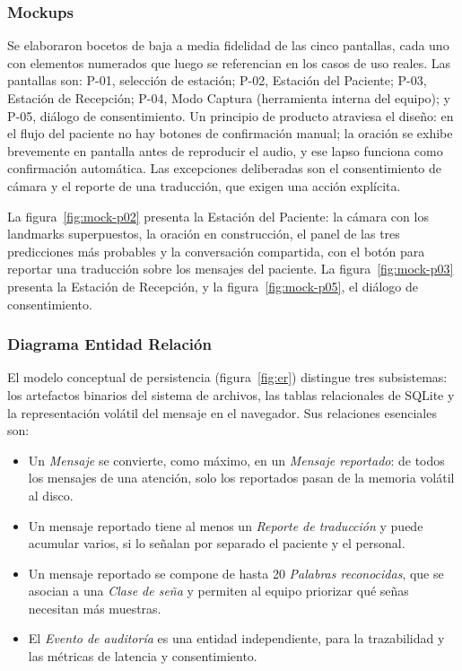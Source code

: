 \subsubsection{Mockups}

Se elaboraron bocetos de baja a media fidelidad de las cinco pantallas, cada uno con elementos numerados que luego se referencian en los casos de uso reales. Las pantallas son: P-01, selección de estación; P-02, Estación del Paciente; P-03, Estación de Recepción; P-04, Modo Captura (herramienta interna del equipo); y P-05, diálogo de consentimiento. Un principio de producto atraviesa el diseño: en el flujo del paciente no hay botones de confirmación manual; la oración se exhibe brevemente en pantalla antes de reproducir el audio, y ese lapso funciona como confirmación automática. Las excepciones deliberadas son el consentimiento de cámara y el reporte de una traducción, que exigen una acción explícita.

La figura~\ref{fig:mock-p02} presenta la Estación del Paciente: la cámara con los landmarks superpuestos, la oración en construcción, el panel de las tres predicciones más probables y la conversación compartida, con el botón para reportar una traducción sobre los mensajes del paciente. La figura~\ref{fig:mock-p03} presenta la Estación de Recepción, y la figura~\ref{fig:mock-p05}, el diálogo de consentimiento.




\subsubsection{Diagrama Entidad Relación}

El modelo conceptual de persistencia (figura~\ref{fig:er}) distingue tres subsistemas: los artefactos binarios del sistema de archivos, las tablas relacionales de SQLite y la representación volátil del mensaje en el navegador. Sus relaciones esenciales son:
\begin{itemize}
  \item Un \emph{Mensaje} se convierte, como máximo, en un \emph{Mensaje reportado}: de todos los mensajes de una atención, solo los reportados pasan de la memoria volátil al disco.
  \item Un mensaje reportado tiene al menos un \emph{Reporte de traducción} y puede acumular varios, si lo señalan por separado el paciente y el personal.
  \item Un mensaje reportado se compone de hasta 20 \emph{Palabras reconocidas}, que se asocian a una \emph{Clase de seña} y permiten al equipo priorizar qué señas necesitan más muestras.
  \item El \emph{Evento de auditoría} es una entidad independiente, para la trazabilidad y las métricas de latencia y consentimiento.
\end{itemize}

